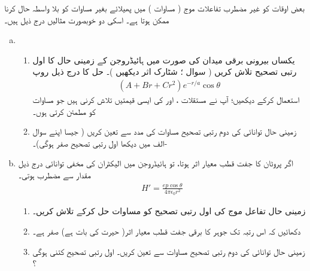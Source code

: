 بعض اوقات  کو غیر مضطرب تفاعلات موج ( مساوات ) میں پھیلائے بغیر مساوات  کو بلا واسطہ حال کرنا ممکن ہوتا ہے۔ اسکی دو خوبصورت مثالیں درج ذیل ہیں۔
\begin{enumerate}[a.]
\item
 \begin{enumerate}[1.]
 \item
 یکساں بیرونی برقی میدان  کی صورت میں ہائیڈروجن کے زمینی حال کا اول رتبی تصحیح تلاش کریں ( سوال ؛ شٹارک اثر دیکھیں )۔ حل کا درج ذیل روپ 
\begin{align*}
(A+Br+Cr^{2})e^{-r/a}\cos\theta
\end{align*}
استعمال کرکے دیکھیں؛ آپ نے مستقلات  ، اور  کی ایسی قیمتیں تلاش کرنی ہیں جو مساوات  کو مطمئن کرتی ہوں۔
\item
 زمینی حال توانائی کی دوم رتبی تصحیح مساوات  کی مدد سے تعین کریں ( جیسا اپنے سوال -الف میں دیکھا اول رتبی تصحیح صفر ہوگی)۔ 
\end{enumerate}
\item
 اگر پروٹان کا  جفت قطب معیار اثر  ہوتا، تو ہائیڈروجن میں الیکٹران کی مخفی توانائی درج ذیل مقدار سے مضطرب ہوتی۔
\begin{align*}
H'=\frac{ep\cos\theta}{4\pi\epsilon _0r^{2}}
\end{align*}
\begin{enumerate}[1.]
\item
 زمینی حال تفاعل موج کی اول رتبی تصحیح کو مساوات  حل کرکے تلاش کریں۔
\item
 دکھائیں کہ اس رتبہ تک جوہر کا  برقی جفت قطب معیار اثر( حیرت کی بات ہے) صفر ہے۔ 
\item
 زمینی حال توانائی کی دوم رتبی تصحیح مساوات  سے تعین کریں۔ اول رتبی تصحیح کتنی ہوگی ؟
\end{enumerate}
\end{enumerate}

